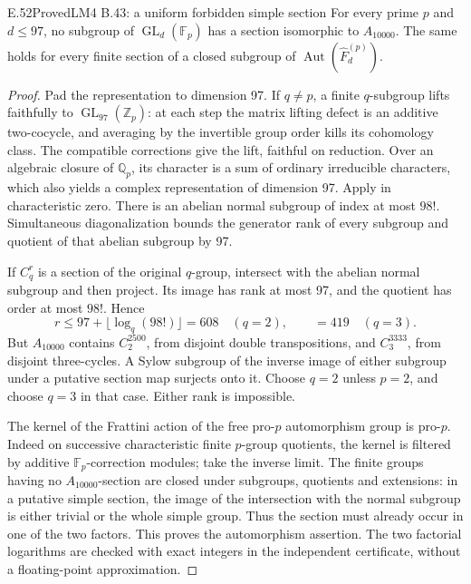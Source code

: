 \begin{result}{E.52}{Proved}{LM4 B.43: a uniform forbidden simple section}
For every prime \(p\) and \(d\le97\), no subgroup of
\(\operatorname{GL}_d(\mathbb F_p)\) has a section isomorphic to
\(A_{10000}\). The same holds for every finite section of a closed
subgroup of \(\operatorname{Aut}(\widehat F_d^{(p)})\).
\end{result}
\begin{proof}
Pad the representation to dimension 97. If \(q\ne p\), a finite
\(q\)-subgroup lifts faithfully to \(\operatorname{GL}_{97}(\mathbb Z_p)\):
at each step the matrix lifting defect is an additive two-cocycle, and
averaging by the invertible group order kills its cohomology class.
The compatible corrections give the lift, faithful on reduction.
Over an algebraic closure of \(\mathbb Q_p\), its character is a sum
of ordinary irreducible characters, which also yields a complex
representation of dimension 97. Apply
\citet[Theorem A, p.~412]{SymCollins2007} in characteristic zero.
There is an abelian normal subgroup of index at most \(98!\).
Simultaneous diagonalization bounds the generator rank of every
subgroup and quotient of that abelian subgroup by 97.

If \(C_q^r\) is a section of the original \(q\)-group, intersect
with the abelian normal subgroup and then project. Its image has rank
at most 97, and the quotient has order at most \(98!\). Hence
\[
 r\le97+\lfloor\log_q(98!)\rfloor
 =608\quad(q=2),\qquad =419\quad(q=3).
\]
But \(A_{10000}\) contains \(C_2^{2500}\), from disjoint double
transpositions, and \(C_3^{3333}\), from disjoint three-cycles.
A Sylow subgroup of the inverse image of either subgroup under a
putative section map surjects onto it. Choose \(q=2\) unless \(p=2\),
and choose \(q=3\) in that case. Either rank is impossible.

The kernel of the Frattini action of the free pro-\(p\) automorphism
group is pro-\(p\). Indeed on successive characteristic finite
\(p\)-group quotients, the kernel is filtered by additive
\(\mathbb F_p\)-correction modules; take the inverse limit.
The finite groups having no \(A_{10000}\)-section are closed under
subgroups, quotients and extensions: in a putative simple section, the
image of the intersection with the normal subgroup is either trivial
or the whole simple group. Thus the section must already occur in one
of the two factors. This proves the automorphism assertion.
The two factorial logarithms are checked with exact integers in the
independent certificate, without a floating-point approximation.
\end{proof}


